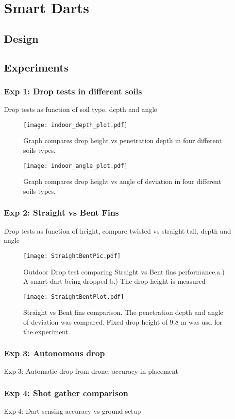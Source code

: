 \section{Smart Darts}\label{sec:SmartDarts}

\subsection{Design}

\subsection{Experiments}
\subsubsection{Exp 1: Drop tests in different soils} 
Drop tests as function of soil type, depth and angle\\
\begin{figure} \centering
{\texttt{[image: indoor\_depth\_plot.pdf]}}
\caption{Graph compares drop height vs penetration depth in four different soils types.} 
\label{fig:DepthPlotIndoors}
\vspace{-1em}
\end{figure}
\begin{figure} \centering
{\texttt{[image: indoor\_angle\_plot.pdf]}}
\caption{Graph compares drop height vs angle of deviation in four different soils types.} 
\label{fig:AnglePlotIndoors}
\vspace{-1em}
\end{figure}
\subsubsection{Exp 2: Straight vs Bent Fins}
Drop tests as function of height, compare twisted vs straight tail, depth and angle\\
\begin{figure} \centering
  {\texttt{[image: StraightBentPic.pdf]}}
 \caption{Outdoor Drop test comparing Straight vs Bent fins performance.a.) A smart dart being dropped b.) The drop height is measured} 
 \label{fig:StraightBentPic}
 \vspace{-1em}
\end{figure}
\begin{figure} \centering
  {\texttt{[image: StraightBentPlot.pdf]}}
 \caption{Straight vs Bent fins comparison. The penetration depth and angle of deviation was compared. Fixed drop height of 9.8 m was usd for the experiment.} 
 \label{fig:StraightBentPlot}
 \vspace{-1em}
\end{figure}

\subsubsection{Exp 3: Autonomous drop}
Exp 3: Automatic drop from drone, accuracy in placement\\
\subsubsection{Exp 4: Shot gather comparison}
Exp 4: Dart sensing accuracy vs ground setup\\
 
